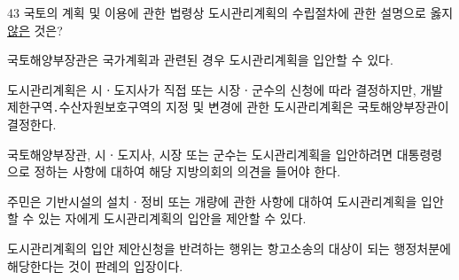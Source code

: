 \begin{question}{43}
국토의 계획 및 이용에 관한 법령상 도시관리계획의 수립절차에 관한 설명으로 옳지 \uline{않은} 것은?
\begin{choices}
  \item 국토해양부장관은 국가계획과 관련된 경우 도시관리계획을 입안할 수 있다.
  \item 도시관리계획은 시ㆍ도지사가 직접 또는 시장ㆍ군수의 신청에 따라 결정하지만, 개발제한구역․수산자원보호구역의 지정 및 변경에 관한 도시관리계획은 국토해양부장관이 결정한다.
  \item 국토해양부장관, 시ㆍ도지사, 시장 또는 군수는 도시관리계획을 입안하려면 대통령령으로 정하는 사항에 대하여 해당 지방의회의 의견을 들어야 한다.
  \item 주민은 기반시설의 설치ㆍ정비 또는 개량에 관한 사항에 대하여 도시관리계획을 입안할 수 있는 자에게 도시관리계획의 입안을 제안할 수 있다.
  \item 도시관리계획의 입안 제안신청을 반려하는 행위는 항고소송의 대상이 되는 행정처분에 해당한다는 것이 판례의 입장이다.
\end{choices}
\end{question}
